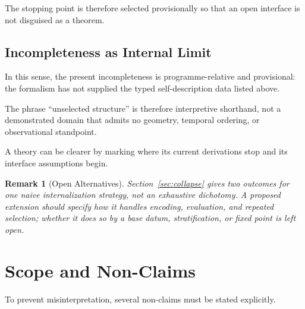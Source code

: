 \documentclass[12pt,a4paper]{article}
\newtheorem{remark}[theorem]{Remark}
\begin{document}
The stopping point is therefore selected provisionally so that an open interface is not disguised as a theorem.

\subsection{Incompleteness as Internal Limit}

In this sense, the present incompleteness is programme-relative and provisional: the formalism has not supplied the typed self-description data listed above.

The phrase ``unselected structure'' is therefore interpretive shorthand, not a demonstrated domain that admits no geometry, temporal ordering, or observational standpoint.

A theory can be clearer by marking where its current derivations stop and its interface assumptions begin.

\begin{remark}[Open Alternatives]
Section~\ref{sec:collapse} gives two outcomes for one naive internalization strategy, not an exhaustive dichotomy.  A proposed extension should specify how it handles encoding, evaluation, and repeated selection; whether it does so by a base datum, stratification, or fixed point is left open.
\end{remark}

\section{Scope and Non-Claims}
\label{sec:nonclaims}

To prevent misinterpretation, several non-claims must be stated explicitly.
\end{document}
